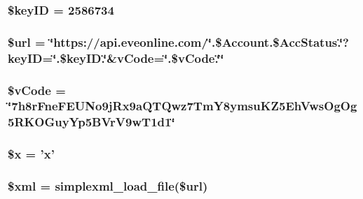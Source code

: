 \hypertarget{extended_char_info_8php_a19e4271e6a84a7952c9efc65569318bc}{
\subsubsection[{\$key\+I\+D}]{\setlength{\rightskip}{0pt plus 5cm}\$key\+I\+D = 2586734}}\label{extended_char_info_8php_a19e4271e6a84a7952c9efc65569318bc}
\hypertarget{extended_char_info_8php_acf215f34a917d014776ce684a9ee8909}{
\subsubsection[{\$url}]{\setlength{\rightskip}{0pt plus 5cm}\$url = \char`\"{}https\+://api.\+eveonline.\+com/\char`\"{}.\$Account.\$\+Acc\+Status.\char`\"{}?key\+I\+D=\char`\"{}.\$key\+I\+D.\char`\"{}\&v\+Code=\char`\"{}.\$v\+Code.\char`\"{}\char`\"{}}}\label{extended_char_info_8php_acf215f34a917d014776ce684a9ee8909}
\hypertarget{extended_char_info_8php_a55dd43886b9084aeee05444024079444}{
\subsubsection[{\$v\+Code}]{\setlength{\rightskip}{0pt plus 5cm}\$v\+Code = \char`\"{}7h8r\+Fne\+F\+E\+U\+No9j\+Rx9a\+Q\+T\+Qwz7\+Tm\+Y8ymsu\+K\+Z5\+Eh\+Vws\+Og\+Og5\+R\+K\+O\+Guy\+Yp5\+B\+Vr\+V9w\+T1d1\char`\"{}}}\label{extended_char_info_8php_a55dd43886b9084aeee05444024079444}
\hypertarget{extended_char_info_8php_af3a16c5f0dd7a74cf9acf6a49fff73a7}{
\subsubsection[{\$x}]{\setlength{\rightskip}{0pt plus 5cm}\$x = 'x'}}\label{extended_char_info_8php_af3a16c5f0dd7a74cf9acf6a49fff73a7}
\hypertarget{extended_char_info_8php_aa108d9d91e700ac530401dd363b0723b}{
\subsubsection[{\$xml}]{\setlength{\rightskip}{0pt plus 5cm}\$xml = simplexml\+\_\+load\+\_\+file(\$url)}}\label{extended_char_info_8php_aa108d9d91e700ac530401dd363b0723b}
